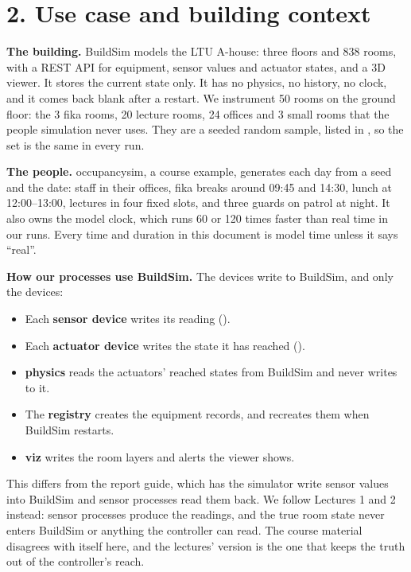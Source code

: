 \section{2. Use case and building context}

\textbf{The building.} BuildSim models the LTU A-house: three floors and 838
rooms, with a REST API for equipment, sensor values and actuator states, and a
3D viewer. It stores the current state only. It has no physics, no history, no
clock, and it comes back blank after a restart. We instrument 50 rooms on the
ground floor: the 3 fika rooms, 20 lecture rooms, 24 offices and 3 small rooms
that the people simulation never uses. They are a seeded random sample, listed
in , so the set is the same in every run.

\textbf{The people.} occupancysim, a course example, generates each day from a
seed and the date: staff in their offices, fika breaks around 09:45 and 14:30,
lunch at 12:00--13:00, lectures in four fixed slots, and three guards on patrol
at night. It also owns the model clock, which runs 60 or 120 times faster than
real time in our runs. Every time and duration in this document is model time
unless it says ``real''.

\textbf{How our processes use BuildSim.} The devices write to BuildSim, and
only the devices:
\begin{itemize}
\tightlist
\item Each \textbf{sensor device} writes its reading
  ().
\item Each \textbf{actuator device} writes the state it has reached
  ().
\item \textbf{physics} reads the actuators' reached states from BuildSim and
  never writes to it.
\item The \textbf{registry} creates the equipment records, and recreates them
  when BuildSim restarts.
\item \textbf{viz} writes the room layers and alerts the viewer shows.
\end{itemize}
This differs from the report guide, which has the simulator write sensor values
into BuildSim and sensor processes read them back. We follow Lectures 1 and 2
instead: sensor processes produce the readings, and the true room state never
enters BuildSim or anything the controller can read. The course material
disagrees with itself here, and the lectures' version is the one that keeps the
truth out of the controller's reach.

